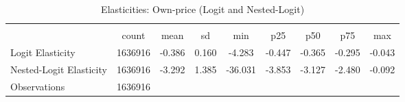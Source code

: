 \begin{table}[htbp]\centering
\def\sym#1{\ifmmode^{#1}\else\(^{#1}\)\fi}
\caption{Elasticities: Own-price (Logit and Nested-Logit)}
\begin{tabular}{l*{1}{cccccccc}}
\toprule
                    &\multicolumn{8}{c}{}                                                                                   \\
                    &       count&        mean&          sd&         min&         p25&         p50&         p75&         max\\
\midrule
Logit Elasticity    &     1636916&      -0.386&       0.160&      -4.283&      -0.447&      -0.365&      -0.295&      -0.043\\
Nested-Logit Elasticity&     1636916&      -3.292&       1.385&     -36.031&      -3.853&      -3.127&      -2.480&      -0.092\\
\midrule
Observations        &     1636916&            &            &            &            &            &            &            \\
\bottomrule
\end{tabular}
\end{table}
